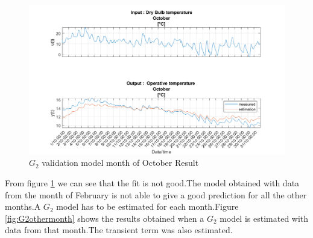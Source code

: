 \documentclass[a4paper,12pt]{article}
\numberwithin{equation}{section}
\begin{document}
\begin{figure}[H]
    \includegraphics[width=\textwidth]{G2_val_OCT.png}
    \centering
    \caption{$G_{2}$ validation model month of October Result}
    \label{fig:G2oneMONTHValidation}
\end{figure}

From  figure \ref{fig:G2oneMONTHValidation} we can see that the fit is not good.The model obtained with data from the month of February is not able to give a good prediction for all the other months.A $G_{2}$ model has to be estimated for each month.Figure \ref{fig:G2othermonth} shows the results obtained when a  $G_{2}$ model is estimated with data from that month.The transient term was also estimated.
\end{document}
